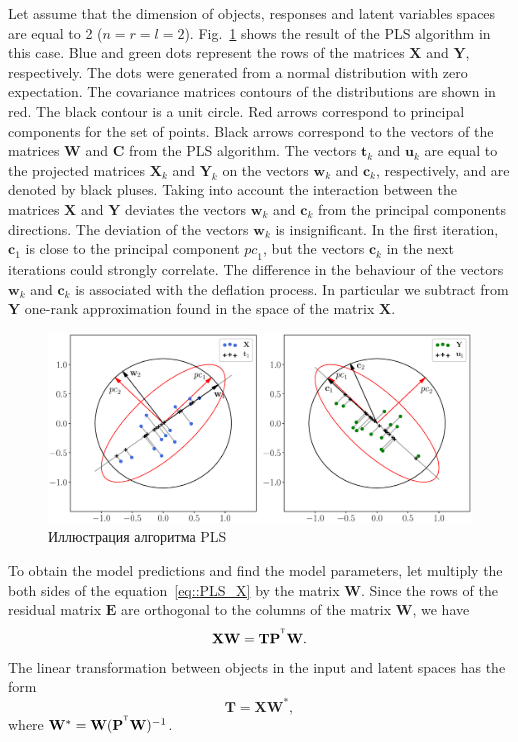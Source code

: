\documentclass[12pt,twoside]{article}
\newcommand{\bw}{\mathbf{w}}
\newcommand{\bY}{\mathbf{Y}}
\newcommand{\bX}{\mathbf{X}}
\newcommand{\bu}{\mathbf{u}}
\newcommand{\bt}{\mathbf{t}}
\newcommand{\bc}{\mathbf{c}}
\newcommand{\bP}{\mathbf{P}}
\newcommand{\bT}{\mathbf{T}}
\newcommand{\bC}{\mathbf{C}}
\newcommand{\bE}{\mathbf{E}}
\newcommand{\bW}{\mathbf{W}}
\newcommand{\T}{^{\text{\tiny\sffamily\upshape\mdseries T}}}
\begin{document}
\hrulefill

Let assume that the dimension of objects, responses and latent variables spaces are equal to 2 ($n = r = l = 2$).
Fig.~\ref{fig::PLSFigure} shows the result of the PLS algorithm in this case.
Blue and green dots represent the rows of the matrices $\bX$ and $\bY$, respectively. 
The dots were generated from a normal distribution with zero expectation. 
The covariance matrices contours of the distributions are shown in red.
The black contour is a unit circle. 
Red arrows correspond to principal components for the set of points. 
Black arrows correspond to the vectors of the matrices $\bW$ and $\bC$ from the PLS algorithm. 
The vectors $\bt_k$ and $\bu_k$ are equal to the projected matrices $\bX_k$ and $\bY_k$ on the vectors $\bw_k$ and $\bc_k$, respectively, and are denoted by black pluses. 
Taking into account the interaction between the matrices $\bX$ and $\bY$ deviates the vectors $\bw_k$ and $\bc_k$ from the principal components directions. 
The deviation of the vectors $\bw_k$ is insignificant. 
In the first iteration, $\bc_1$ is close to the principal component $\textit{pc}_1$, but the vectors $\bc_k$ in the next iterations could strongly correlate. 
The difference in the behaviour of the vectors $\bw_k$ and $\bc_k$ is associated with the deflation process. In particular we subtract from $\bY$ one-rank approximation found in the space of the matrix $\bX$.
\begin{figure}[h]
	\centering
	\includegraphics[width=\linewidth]{figs/PLSFigure.eps}
	\caption{Иллюстрация алгоритма PLS}
	\label{fig::PLSFigure}
\end{figure}

To obtain the model predictions and find the model parameters, let multiply the both sides of the equation~\eqref{eq::PLS_X} by the matrix $\bW$. Since the rows of the residual matrix  $\bE$ are orthogonal to the columns of the matrix $\bW$, we have
\[
	\bX \bW = \bT \bP^{\T} \bW.
\]
The linear transformation between objects in the input and latent spaces has the form
\begin{equation}
	\bT = \bX \bW^*,
	\label{eq::W*}
\end{equation}
where $\bW^* = \bW (\bP^{\T} \bW)^{-1}$.
\end{document}
